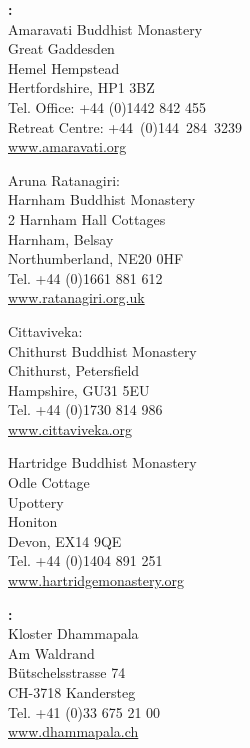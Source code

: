 {\raggedright

\textbf{\MakeUppercase{\xUnitedKingdom}:}\\
Amaravati Buddhist Monastery\\
Great Gaddesden\\
Hemel Hempstead\\
Hertfordshire, HP1 3BZ\\
Tel. Office: +44 (0)1442 842 455\\
Retreat Centre: \mbox{+44 (0)144 284 3239}\\
\href{http://www.amaravati.org}{www.amaravati.org}

\vfill

Aruna Ratanagiri:\\
Harnham Buddhist Monastery\\
2 Harnham Hall Cottages\\
Harnham, Belsay\\
Northumberland, NE20 0HF\\
Tel. +44 (0)1661 881 612\\
\href{http://www.ratanagiri.org.uk}{www.ratanagiri.org.uk}

\vfill

Cittaviveka:\\
Chithurst Buddhist Monastery\\
Chithurst, Petersfield\\
Hampshire, GU31 5EU\\
Tel. +44 (0)1730 814 986\\
\href{http://www.cittaviveka.org}{www.cittaviveka.org}

\vfill

Hartridge Buddhist Monastery\\
Odle Cottage\\
Upottery\\
Honiton\\
Devon, EX14 9QE\\
Tel. +44 (0)1404 891 251\\
\href{http://www.hartridgemonastery.org}{www.hartridgemonastery.org}

\vfill

\textbf{\MakeUppercase{\xSwitzerland}:} \\
Kloster Dhammapala\\
Am Waldrand\\
Bütschelsstrasse 74\\
CH-3718 Kandersteg\\
Tel. +41 (0)33 675 21 00\\
\href{http://www.dhammapala.ch}{www.dhammapala.ch}

}
